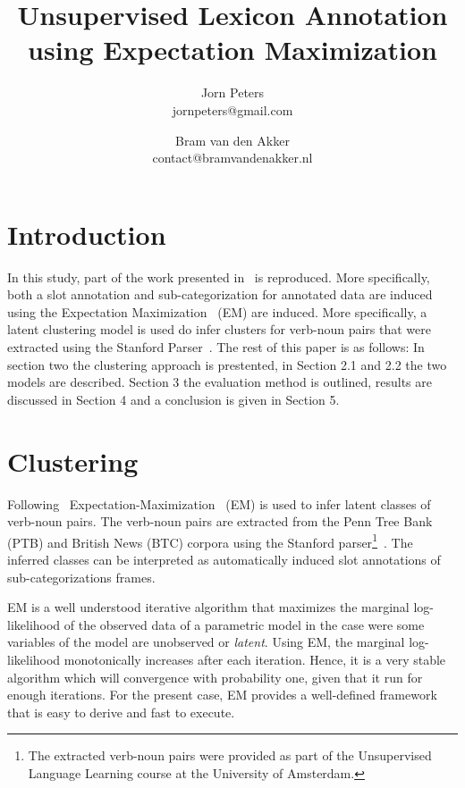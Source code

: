 \documentclass[11pt]{scrartcl}
\title{Unsupervised Lexicon Annotation using Expectation Maximization}
\author{Jorn Peters\\\small{jornpeters@gmail.com} \and Bram van den Akker\\\small{contact@bramvandenakker.nl}}
\begin{document}
\maketitle


\section{Introduction} %
In this study, part of the work presented in~\cite{rooth1999inducing}
is reproduced. More specifically, both a slot annotation and
sub-categorization for annotated data are induced using the
Expectation Maximization~\cite{dempster1977maximum} (EM) are
induced. More specifically, a latent clustering model is used do infer
clusters for verb-noun pairs that were extracted using the Stanford
Parser~\cite{klein2003accurate}. The rest of this paper is as follows:
In section two the clustering approach is prestented, in Section 2.1
and 2.2 the two models are described. Section 3 the evaluation method
is outlined, results are discussed in Section 4 and a conclusion is
given in Section 5.

\section{Clustering} %
Following~\cite{rooth1999inducing}
Expectation-Maximization~\cite{dempster1977maximum} (EM) is used to
infer latent classes of verb-noun pairs. The verb-noun pairs are
extracted from the Penn Tree Bank (PTB) and British News (BTC) corpora
using the Stanford parser\footnote{The extracted verb-noun pairs were
provided as part of the Unsupervised Language Learning course at the
University of Amsterdam.}~\cite{klein2003accurate}.  The inferred
classes can be interpreted as automatically induced slot annotations
of sub-categorizations frames.

EM is a well understood iterative algorithm that maximizes the
marginal log-likelihood of the observed data of a parametric model in
the case were some variables of the model are unobserved or
\textit{latent}. Using EM, the marginal log-likelihood monotonically
increases after each iteration. Hence, it is a very stable algorithm
which will convergence with probability one, given that it run for
enough iterations. For the present case, EM provides a well-defined
framework that is easy to derive and fast to execute.
\end{document}

